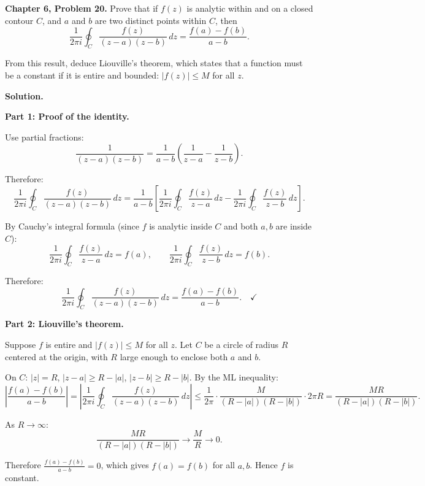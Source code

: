 \documentclass[12pt]{article}
\begin{document}
\textbf{Chapter 6, Problem 20.} Prove that if $f(z)$ is analytic within and on a closed contour $C$, and $a$ and $b$ are two distinct points within $C$, then
\[
\frac{1}{2\pi i}\oint_C \frac{f(z)}{(z-a)(z-b)}\,dz = \frac{f(a)-f(b)}{a-b}.
\]

From this result, deduce Liouville's theorem, which states that a function must be a constant if it is entire and bounded: $|f(z)| \leq M$ for all $z$.

\bigskip
\textbf{Solution.}

\textbf{Part 1: Proof of the identity.}

Use partial fractions:
\[
\frac{1}{(z-a)(z-b)} = \frac{1}{a-b}\left(\frac{1}{z-a} - \frac{1}{z-b}\right).
\]

Therefore:
\[
\frac{1}{2\pi i}\oint_C \frac{f(z)}{(z-a)(z-b)}\,dz = \frac{1}{a-b}\left[\frac{1}{2\pi i}\oint_C\frac{f(z)}{z-a}\,dz - \frac{1}{2\pi i}\oint_C\frac{f(z)}{z-b}\,dz\right].
\]

By Cauchy's integral formula (since $f$ is analytic inside $C$ and both $a,b$ are inside $C$):
\[
\frac{1}{2\pi i}\oint_C\frac{f(z)}{z-a}\,dz = f(a), \qquad \frac{1}{2\pi i}\oint_C\frac{f(z)}{z-b}\,dz = f(b).
\]

Therefore:
\[
\frac{1}{2\pi i}\oint_C \frac{f(z)}{(z-a)(z-b)}\,dz = \frac{f(a)-f(b)}{a-b}. \quad \checkmark
\]

\textbf{Part 2: Liouville's theorem.}

Suppose $f$ is entire and $|f(z)| \leq M$ for all $z$. Let $C$ be a circle of radius $R$ centered at the origin, with $R$ large enough to enclose both $a$ and $b$.

On $C$: $|z| = R$, $|z-a| \geq R - |a|$, $|z-b| \geq R - |b|$. By the ML inequality:
\[
\left|\frac{f(a)-f(b)}{a-b}\right| = \left|\frac{1}{2\pi i}\oint_C \frac{f(z)}{(z-a)(z-b)}\,dz\right| \leq \frac{1}{2\pi}\cdot\frac{M}{(R-|a|)(R-|b|)}\cdot 2\pi R = \frac{MR}{(R-|a|)(R-|b|)}.
\]

As $R \to \infty$:
\[
\frac{MR}{(R-|a|)(R-|b|)} \to \frac{M}{R} \to 0.
\]

Therefore $\frac{f(a)-f(b)}{a-b} = 0$, which gives $f(a) = f(b)$ for all $a, b$. Hence $f$ is constant.
\end{document}
